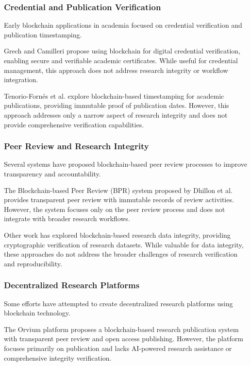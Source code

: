\documentclass[10pt,twocolumn]{article}
\begin{document}
\subsubsection{Credential and Publication Verification}

Early blockchain applications in academia focused on credential verification and publication timestamping.

Grech and Camilleri \cite{grech2017blockchain} propose using blockchain for digital credential verification, enabling secure and verifiable academic certificates. While useful for credential management, this approach does not address research integrity or workflow integration.

Tenorio-Fornés et al. \cite{tenorio2019blockchain} explore blockchain-based timestamping for academic publications, providing immutable proof of publication dates. However, this approach addresses only a narrow aspect of research integrity and does not provide comprehensive verification capabilities.

\subsubsection{Peer Review and Research Integrity}

Several systems have proposed blockchain-based peer review processes to improve transparency and accountability.

The Blockchain-based Peer Review (BPR) system proposed by Dhillon et al. provides transparent peer review with immutable records of review activities. However, the system focuses only on the peer review process and does not integrate with broader research workflows.

Other work has explored blockchain-based research data integrity, providing cryptographic verification of research datasets. While valuable for data integrity, these approaches do not address the broader challenges of research verification and reproducibility.

\subsubsection{Decentralized Research Platforms}

Some efforts have attempted to create decentralized research platforms using blockchain technology.

The Orvium platform proposes a blockchain-based research publication system with transparent peer review and open access publishing. However, the platform focuses primarily on publication and lacks AI-powered research assistance or comprehensive integrity verification.
\end{document}
